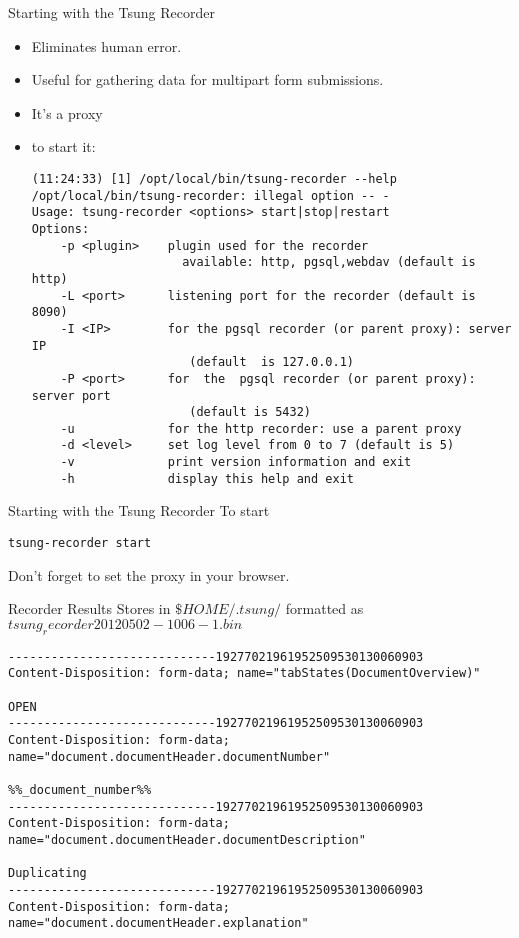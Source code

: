 \documentclass[xcolor=dvipsnames,14pt]{beamer}
\begin{document}
\begin{frame}[fragile]{Starting with the Tsung Recorder}
  \begin{itemize}
    \item Eliminates human error.
    \item Useful for gathering data for multipart form submissions.
    \item It's a proxy
    \item to start it:
    \begin{verbatim}
(11:24:33) [1] /opt/local/bin/tsung-recorder --help
/opt/local/bin/tsung-recorder: illegal option -- -
Usage: tsung-recorder <options> start|stop|restart
Options:
    -p <plugin>    plugin used for the recorder
                     available: http, pgsql,webdav (default is http)
    -L <port>      listening port for the recorder (default is 8090)
    -I <IP>        for the pgsql recorder (or parent proxy): server IP
                      (default  is 127.0.0.1)
    -P <port>      for  the  pgsql recorder (or parent proxy): server port
                      (default is 5432)
    -u             for the http recorder: use a parent proxy
    -d <level>     set log level from 0 to 7 (default is 5)
    -v             print version information and exit
    -h             display this help and exit    
    \end{verbatim}
  \end{itemize}
\end{frame}

\begin{frame}[fragile]{Starting with the Tsung Recorder}
  To start
  \begin{verbatim}
tsung-recorder start
  \end{verbatim}
  Don't forget to set the proxy in your browser.
\end{frame}

\begin{frame}[fragile]{Recorder Results}
Stores in $\$HOME/.tsung/$ formatted as $tsung_recorder20120502-1006-1.bin$
\begin{verbatim}
-----------------------------19277021961952509530130060903
Content-Disposition: form-data; name="tabStates(DocumentOverview)"

OPEN
-----------------------------19277021961952509530130060903
Content-Disposition: form-data; name="document.documentHeader.documentNumber"

%%_document_number%%
-----------------------------19277021961952509530130060903
Content-Disposition: form-data; name="document.documentHeader.documentDescription"

Duplicating
-----------------------------19277021961952509530130060903
Content-Disposition: form-data; name="document.documentHeader.explanation"
\end{verbatim}
\end{frame}
\end{document}
